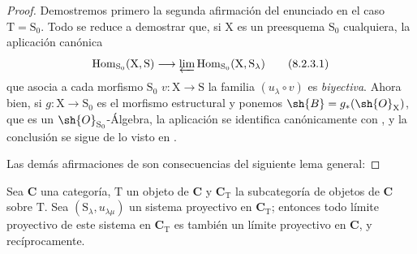 \begin{proof}
Demostremos primero la segunda afirmación del enunciado en el caso $\mathrm{T}=\mathrm{S}_0$.
Todo se reduce a demostrar que, si $\mathrm{X}$ es un preesquema $\mathrm{S}_0$ cualquiera, la aplicación canónica
\begin{equation}
  \operatorname{Hom}_{\mathrm{S}_0}(\mathrm{X},\mathrm{S})\to\varprojlim\operatorname{Hom}_{\mathrm{S}_0}(\mathrm{X},\mathrm{S}_\lambda)
  \tag{8.2.3.1}
\label{IV.8.2.3.1}
\end{equation}
que asocia a cada morfismo $\mathrm{S}_0$ $v:\mathrm{X}\to\mathrm{S}$ la familia $(u_\lambda\circ v)$ es \emph{biyectiva}.
Ahora bien, si $g:\mathrm{X}\to\mathrm{S}_0$ es el morfismo estructural y ponemos $\sh{B}=g_*(\sh{O}_\mathrm{X})$, que es un $\sh{O}_{\mathrm{S}_0}$-Álgebra, la aplicación  se identifica canónicamente con  , y la conclusión se sigue de lo visto en .

Las demás afirmaciones de  son consecuencias del siguiente lema general:
\end{proof}

\begin{lemma}[8.2.4]
\label{IV.8.2.4}
Sea $\mathbf{C}$ una categoría, $\mathrm{T}$ un objeto de $\mathbf{C}$ y $\mathbf{C}_\mathrm{T}$ la subcategoría de objetos de $\mathbf{C}$ sobre $\mathrm{T}$.
Sea $(\mathrm{S}_\lambda,u_{\lambda\mu})$ un sistema proyectivo en $\mathbf{C}_\mathrm{T}$; entonces todo límite proyectivo de este sistema en $\mathbf{C}_\mathrm{T}$ es también un límite proyectivo en $\mathbf{C}$, y recíprocamente.
\end{lemma}

